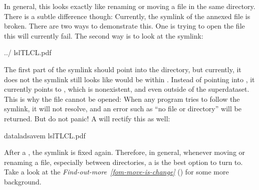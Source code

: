 \sphinxAtStartPar
In general, this looks exactly like renaming or moving a file
in the same directory. There is a subtle difference though:
Currently, the symlink of the annexed file is broken. There
are two ways to demonstrate this. One is trying to open the
file \textendash{} this will currently fail. The second way is to look
at the symlink:

\begin{sphinxVerbatim}[commandchars=\\\{\}]
../
ls\PYGZhy{}lTLCL.pdf
\end{sphinxVerbatim}

\sphinxAtStartPar
The first part of the symlink should point into the 
directory, but currently, it does not \textendash{} the symlink still looks
like  would be within . Instead of pointing
into , it currently points to , which is non\sphinxhyphen{}existent,
and even outside of the superdataset. This is why the file
cannot be opened: When any program tries to follow the symlink,
it will not resolve, and an error such as “no file or directory”
will be returned. But do not panic! A  will
rectify this as well:

\begin{sphinxVerbatim}[commandchars=\\\{\}]
dataladsave\PYGZhy{}m
ls\PYGZhy{}lTLCL.pdf
\end{sphinxVerbatim}

\sphinxAtStartPar
After a , the symlink is fixed again.
Therefore, in general, whenever moving or renaming a file,
especially between directories, a  is
the best option to turn to. Take a look at the
\textit{Find-out-more}~{\findoutmoreiconinline}\textit{\ref{fom-move-is-change}} {\hyperref[\detokenize{basics/101-136-filesystem:fom-move-is-change}]{}} ()
for some more background.

